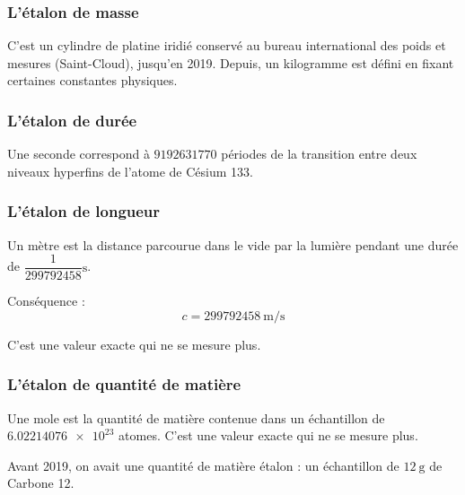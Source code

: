 \subsubsection{L'étalon de masse}

C'est un cylindre de platine iridié conservé au bureau international des poids et mesures (Saint-Cloud), jusqu'en 2019. Depuis, un kilogramme est défini en fixant certaines constantes physiques.

\subsubsection{L'étalon de durée}

Une seconde correspond à \(\num{9192631770}\) périodes de la transition entre deux niveaux hyperfins de l'atome de Césium 133.

\subsubsection{L'étalon de longueur}

Un mètre est la distance parcourue dans le vide par la lumière pendant une durée de \(\dfrac{1}{\num{299792458}}\unit{\second}\).

Conséquence : \[c=\SI{299792458}{\metre\per\second}\]

C'est une valeur exacte qui ne se mesure plus.

\subsubsection{L'étalon de quantité de matière}

Une mole est la quantité de matière contenue dans un échantillon de \(\num{6.02214076e23}\) atomes. C'est une valeur exacte qui ne se mesure plus.

Avant 2019, on avait une quantité de matière étalon : un échantillon de \(\SI{12}{\gram}\) de Carbone 12.